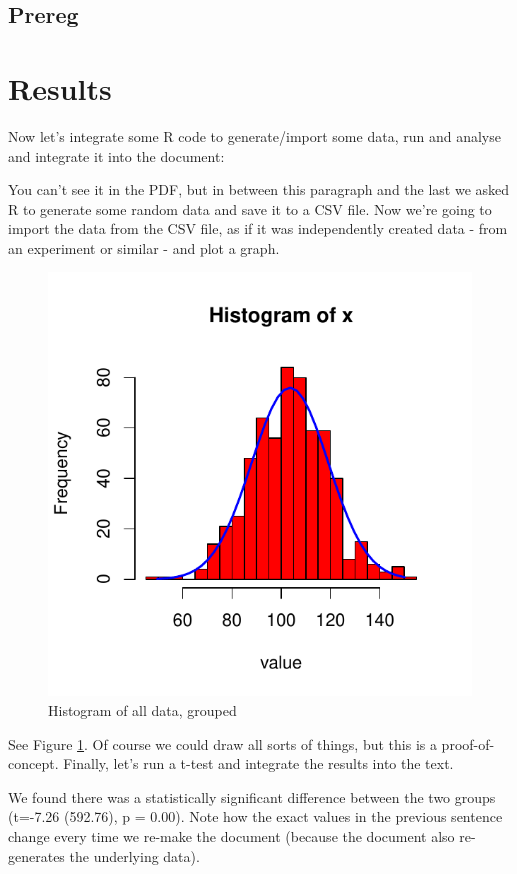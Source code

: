 \documentclass[
  ,jou,floatsintext]{apa6}
\begin{document}
\hypertarget{prereg}{%
\subsection{Prereg}\label{prereg}}

\hypertarget{results}{%
\section{Results}\label{results}}

Now let's integrate some R code to generate/import some data, run and analyse and integrate it into the document:

You can't see it in the PDF, but in between this paragraph and the last we asked R to generate some random data and save it to a CSV file. Now we're going to import the data from the CSV file, as if it was independently created data - from an experiment or similar - and plot a graph.

\begin{figure}

{\centering \includegraphics[width=0.75\linewidth]{faithinreason_files/figure-latex/ourhistogram-1} 

}

\caption{Histogram of all data, grouped}\label{fig:ourhistogram}
\end{figure}

See Figure \ref{fig:ourhistogram}. Of course we could draw all sorts of things, but this is a proof-of-concept. Finally, let's run a t-test and integrate the results into the text.

We found there was a statistically significant difference between the two groups (t=-7.26 (592.76), p = 0.00). Note how the exact values in the previous sentence change every time we re-make the document (because the document also re-generates the underlying data).
\end{document}
